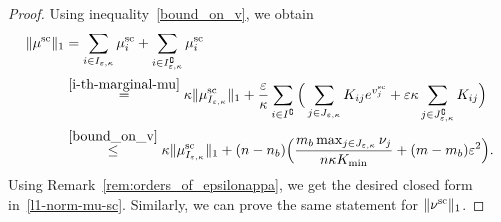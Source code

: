 \begin{proof}
Using inequality~\eqref{bound_on_v}, we obtain 
\begin{align*}
\|\mu^{\text{sc}}\|_1 &= \sum_{i \in I_{\varepsilon,\kappa}} \mu^{\text{sc}}_i +  \sum_{i \in I^\complement_{\varepsilon,\kappa}}\mu^{\text{sc}}_i\\
& \overset{\eqref{i-th-marginal-mu}}{=} \kappa \|\mu_{I_{\varepsilon,\kappa}}^{\text{sc}}\|_1 + \frac \varepsilon\kappa \sum_{i \in I^\complement}\Big( \sum_{j \in J_{\varepsilon,\kappa}} K_{ij} e^{v^{\text{sc}}_j} + \varepsilon\kappa \sum_{j\in J^\complement_{\varepsilon,\kappa}}K_{ij}\Big)\\
& \overset{\eqref{bound_on_v}}{\leq} \kappa \|\mu_{I_{\varepsilon,\kappa}}^{\text{sc}}\|_1 + (n-n_b) \Big(\frac{m_b\max_{j \in J_{\varepsilon,\kappa}} \nu_j}{n\kappa K_{\min}} + (m-m_b)\varepsilon^2 \Big).
\end{align*}
Using Remark~\ref{rem:orders_of_epsilonappa}, we get the desired closed form in~\eqref{l1-norm-mu-sc}.
Similarly, we can prove the same statement for $\|\nu^{\text{sc}}\|_1$.
\end{proof}

